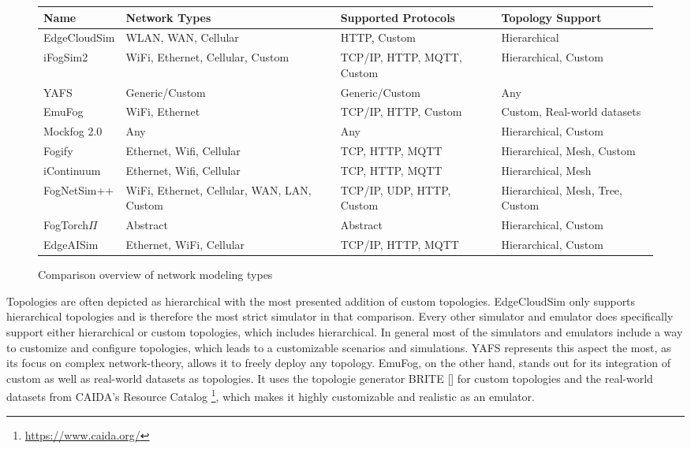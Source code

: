 \begin{figure}[H]
  \centering
  \begin{tabularx}{\textwidth}{ l | X | X | X  }
    \hline
    \textbf{Name} & \textbf{Network Types} & \textbf{Supported Protocols} & \textbf{Topology Support}\\
    \hline\hline
    EdgeCloudSim  & WLAN, WAN, Cellular                         & HTTP, Custom                            & Hierarchical \\\hline
    iFogSim2      & WiFi, Ethernet, Cellular, Custom            & TCP/IP, HTTP, MQTT, Custom              & Hierarchical, Custom\\\hline
    YAFS          & Generic/Custom                              & Generic/Custom                          & Any \\\hline
    EmuFog        & WiFi, Ethernet                              & TCP/IP, HTTP, Custom                    & Custom, Real-world datasets\\\hline
    Mockfog 2.0   & Any                                         & Any                                     & Hierarchical, Custom \\\hline
    Fogify        & Ethernet, Wifi, Cellular                    & TCP, HTTP, MQTT                         & Hierarchical, Mesh, Custom \\\hline
    iContinuum    & Ethernet, Wifi, Cellular                    & TCP, HTTP, MQTT                         & Hierarchical, Mesh \\\hline
    FogNetSim++   & WiFi, Ethernet, Cellular, WAN, LAN, Custom  & TCP/IP, UDP, HTTP, Custom               & Hierarchical, Mesh, Tree, Custom \\\hline
    FogTorch$\Pi$ & Abstract                                    & Abstract                                & Hierarchical, Custom \\\hline
    EdgeAISim     & Ethernet, WiFi, Cellular                    & TCP/IP, HTTP, MQTT                      & Hierarchical, Custom \\\hline
  \end{tabularx}
  \caption{Comparison overview of network modeling types}
  \label{tab:analysis-network-modeling-types}
\end{figure}

Topologies are often depicted as hierarchical with the most presented addition of custom topologies.
EdgeCloudSim only supports hierarchical topologies and is therefore the most strict simulator in that comparison.
Every other simulator and emulator does specifically support either hierarchical or custom topologies, which includes hierarchical.
In general most of the simulators and emulators include a way to customize and configure topologies, which leads to a customizable scenarios and simulations.
YAFS represents this aspect the most, as its focus on complex network-theory, allows it to freely deploy any topology.
EmuFog, on the other hand, stands out for its integration of custom as well as real-world datasets as topologies. 
It uses the topologie generator BRITE [\cite{BRITE}] for custom topologies and the real-world datasets from CAIDA's Resource Catalog \footnote{\url{https://www.caida.org/}}, which makes it highly customizable and realistic as an emulator.

